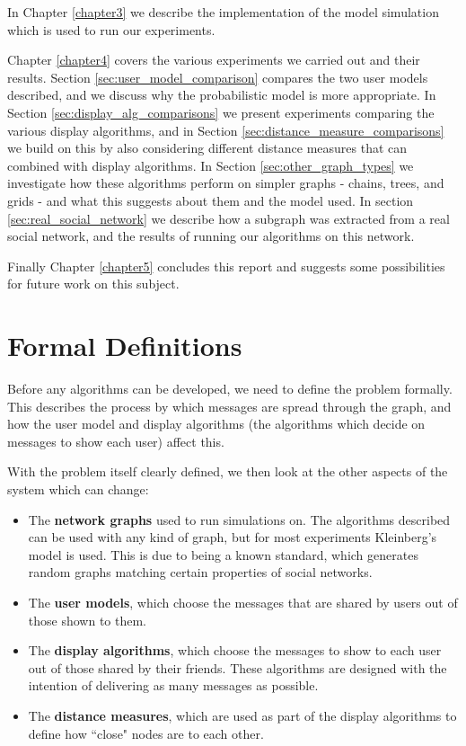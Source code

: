 \documentclass[bsc,frontabs,twoside,singlespacing,parskip,deptreport]{infthesis}     %
\begin{document}
In Chapter \ref{chapter3} we describe the implementation of the model simulation which is used to run our experiments.

Chapter \ref{chapter4} covers the various experiments we carried out and their results. Section \ref{sec:user_model_comparison} compares the two user models described, and we discuss why the probabilistic model is more appropriate. In Section \ref{sec:display_alg_comparisons} we present experiments comparing the various display algorithms, and in Section \ref{sec:distance_measure_comparisons} we build on this by also considering different distance measures that can combined with display algorithms. In Section \ref{sec:other_graph_types} we investigate how these algorithms perform on simpler graphs - chains, trees, and grids - and what this suggests about them and the model used. In section \ref{sec:real_social_network} we describe how a subgraph was extracted from a real social network, and the results of running our algorithms on this network.

Finally Chapter \ref{chapter5} concludes this report and suggests some possibilities for future work on this subject.


\chapter{Formal Definitions} \label{chapter2}

Before any algorithms can be developed, we need to define the problem formally. This describes the process by which messages are spread through the graph, and how the user model and display algorithms (the algorithms which decide on messages to show each user) affect this.

With the problem itself clearly defined, we then look at the other aspects of the system which can change:
\begin{itemize}
\item The \textbf{network graphs} used to run simulations on. The algorithms described can be used with any kind of graph, but for most experiments Kleinberg's model is used. This is due to being a known standard, which generates random graphs matching certain properties of social networks.
\item The \textbf{user models}, which choose the messages that are shared by users out of those shown to them.
\item The \textbf{display algorithms}, which choose the messages to show to each user out of those shared by their friends. These algorithms are designed with the intention of delivering as many messages as possible.
\item The \textbf{distance measures}, which are used as part of the display algorithms to define how ``close" nodes are to each other.
\end{itemize}
\end{document}

